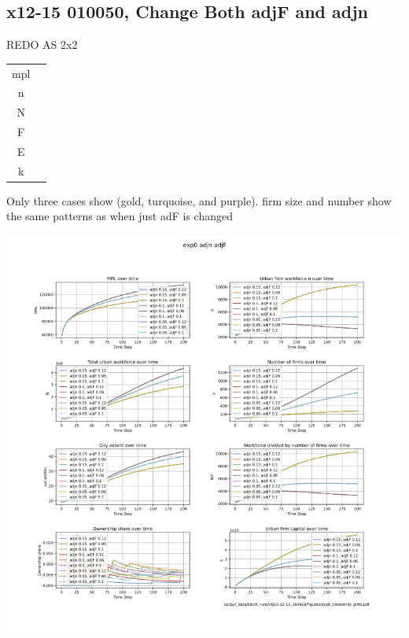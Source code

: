 \documentclass{article}
\begin{document}

 \subsection{x12-15 010050, Change  Both adjF and adjn}

 REDO AS 2x2
\begin{multicols}{2}
\begin{tabular}{c|c}
  mpl  &  \\
  n   &  \\
  N   &  \\
  F   &  \\
  E   &  \\
  k   & 
\end{tabular} 
Only three cases show (gold, turquoise, and purple). firm size and number show the same patterns as when just adF is changed 
\end{multicols}

\includegraphics[scale=.55]{fig/Analysis/F-n-adjustment-speed.png}
\end{document}
